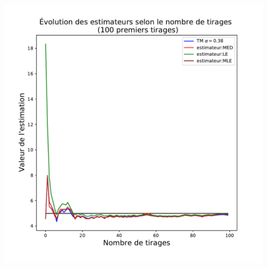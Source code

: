 \documentclass[8pt, sans]{beamer}
\begin{document}
\begin{frame}
\begin{columns}[T]
\begin{column}{0.5\linewidth}
\includegraphics[scale=0.3]{Est-100.pdf}

\end{column}

\end{columns}

\vfill


\end{frame}
\end{document}

